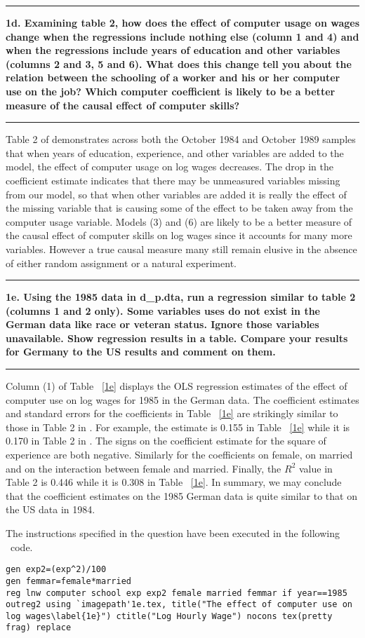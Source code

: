 \documentclass[12pt]{article}
\newcommand\question[1]{\vspace{1em}\hrule\vspace{1em}\textbf{#1}\vspace{1em}\hrule\vspace{1em}}
\begin{document}
\question{1d. Examining \cite{Krueger1993} table 2, how does the effect of computer usage on wages change when the regressions include nothing else (column 1 and 4) and when the regressions include years of education and other variables (columns 2 and 3, 5 and 6). What does this change tell you about the relation between the schooling of a worker and his or her computer use on the job? Which computer coefficient is likely to be a better measure of the causal effect of computer skills?}
Table 2 of \cite{Krueger1993} demonstrates across both the October 1984 and October 1989 samples that when years of education, experience, and other variables are added to the model, the effect of computer usage on log wages decreases. The drop in the coefficient estimate indicates that there may be unmeasured variables missing from our model, so that when other variables are added it is really the effect of the missing variable that is causing some of the effect to be taken away from the computer usage variable. Models (3) and (6) are likely to be a better measure of the causal effect of computer skills on log wages since it accounts for many more variables. However a true causal measure many still remain elusive in the absence of either random assignment or a natural experiment.
\newpage
\question{1e. Using the 1985 data in d\_p.dta, run a regression similar to \cite{Krueger1993} table 2 (columns 1 and 2 only). Some variables \cite{Krueger1993} uses do not exist in the German data like race or veteran status. Ignore those variables unavailable. Show regression results in a table. Compare your results for Germany to the US results and comment on them.}
Column (1) of Table ~\ref{1e} displays the OLS regression estimates of the effect of computer use on log wages for 1985 in the German data. The coefficient estimates and standard errors for the coefficients in Table ~\ref{1e} are strikingly similar to those in Table 2 in \cite{Krueger1993}. For example, the estimate is 0.155 in Table ~\ref{1e} while it is 0.170 in Table 2 in \cite{Krueger1993}. The signs on the coefficient estimate for the square of experience are both negative. Similarly for the coefficients on female, on married and on the interaction between female and married. Finally, the $R^2$ value in \cite{Krueger1993} Table 2 is 0.446 while it is 0.308 in Table ~\ref{1e}. In summary, we may conclude that the coefficient estimates on the 1985 German data is quite similar to that on the US data in 1984.

The instructions specified in the question have been executed in the following \stata \  code.\\
\begin{lstlisting}
gen exp2=(exp^2)/100
gen femmar=female*married
reg lnw computer school exp exp2 female married femmar if year==1985
outreg2 using `imagepath'1e.tex, title("The effect of computer use on log wages\label{1e}") ctitle("Log Hourly Wage") nocons tex(pretty frag) replace
\end{lstlisting}
\end{document}
